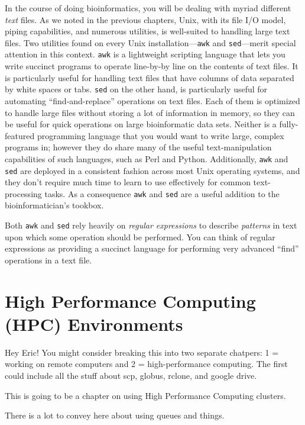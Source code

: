 \documentclass[]{krantz}
\begin{document}
In the course of doing bioinformatics, you will be dealing with myriad different
\emph{text} files. As we noted in the previous chapters, Unix, with its file I/O model,
piping capabilities, and numerous utilities, is well-suited to handling
large text files. Two utilities found on every Unix installation---\texttt{awk} and \texttt{sed}---merit
special attention in this context. \texttt{awk} is a lightweight scripting language that lets
you write succinct programs to operate line-by-by line on the contents of text files. It is
particularly useful for handling text files that have columns of data separated by white spaces
or tabs. \texttt{sed} on the other hand, is particularly useful for automating
``find-and-replace'' operations on text files. Each of them is optimized to
handle large files without storing a lot of information in memory, so they can be
useful for quick operations on large bioinformatic data sets. Neither is a fully-featured
programming language that you would want to write large, complex programs in; however they do share many of the
useful text-manipulation capabilities of such languages, such as Perl and Python. Additionally,
\texttt{awk} and \texttt{sed} are deployed in a consistent fashion across most Unix operating systems, and they
don't require much time to learn to use effectively for common text-processing tasks.
As a consequence \texttt{awk} and \texttt{sed} are a useful addition to the bioinformatician's tookbox.

Both \texttt{awk} and \texttt{sed} rely heavily on \emph{regular expressions} to describe \emph{patterns}
in text upon which some operation should be performed. You can think of
regular expressions as providing a succinct language for performing very advanced ``find'' operations
in a text file.

\hypertarget{high-performance-computing-hpc-environments}{%
\chapter{High Performance Computing (HPC) Environments}\label{high-performance-computing-hpc-environments}}

Hey Eric! You might consider breaking this into two separate chatpers: 1 = working on remote computers
and 2 = high-performance computing. The first could include all the stuff about scp, globus, rclone,
and google drive.

This is going to be a chapter on using High Performance Computing clusters.

There is a lot to convey here about using queues and things.
\end{document}
